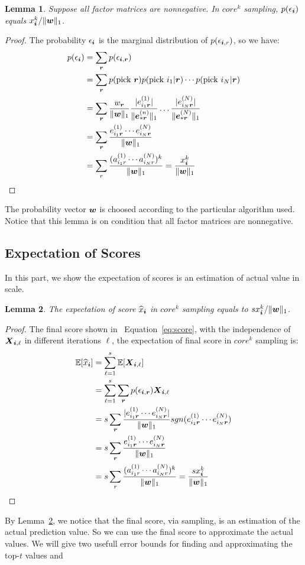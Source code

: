 \documentclass[letterpaper]{article}
\newcommand{\Sca}[3]{{#1}^{(#2)}_{i_#2#3}}%
\newcommand{\anr}[2]{\Sca{a}{#1}{#2}}
\newcommand{\enr}[2]{\Sca{e}{#1}{\V{#2}}}
\newcommand{\score}[1]{\M{X}_{\V{i},#1}}
\newcommand{\V}[1]{{\bm{{\MakeLowercase{#1}}}}}
\newcommand{\VnC}[3]{\V{#1}^{(#2)}_{#3}}
\newcommand{\M}[1]{{\bm{{\MakeUppercase{#1}}}}}
\newcommand{\norm}[2]{\|#1\|_{#2}}
\newcommand{\Eqn}[1]   {Equation~\ref{eq:#1}}
\newcommand{\Lem}[1]  {Lemma~\ref{lem:#1}}
\newcommand{\predx}{\widehat{x}_{\V{i}}}
\newtheorem{lemma}{Lemma}
\begin{document}
\begin{lemma}\label{lem:Probability}
    Suppose all factor matrices are nonnegative.
    In $core^k$ sampling, $p(\epsilon_{\V{i}})$ equals $x^k_{\V{i}}/\norm{\V{w}}{1}$.
\end{lemma}
\begin{proof}
The probability $\epsilon_{\V{i}}$ is the marginal distribution of $p(\epsilon_{\V{i},r})$,
so we have:
\begin{align*}
p(\epsilon_{\V{i}})
& = \sum_{\V{r}} p(\epsilon_{\V{i},\V{r}}) \\
& = \sum_{\V{r}} p({\rm pick\ }\V{r})p({\rm pick\ }i_1|\V{r})\cdots p({\rm pick\ }i_N|\V{r})\\
& = \sum_{\V{r}} \frac{w_{\V{r}}}{\norm{\V{W}}{1}}
    \frac{|\Sca{e}{1}{\V{r}}|}{\norm{\VnC{e}{n}{*\V{r}}}{1}}\ldots\frac{|\Sca{e}{N}{\V{r}}|}{\norm{\VnC{e}{N}{*\V{r}}}{1}}\\
& = \sum_{\V{r}} \frac{\Sca{e}{1}{\V{r}}\cdots\Sca{e}{N}{\V{r}}}{\norm{\V{W}}{1}}\\
& = \sum_{r}\frac{(\anr{1}{r}\cdots\anr{N}{r})^k}{\norm{\V{W}}{1}}
  = \frac{x^k_{\V{i}}}{\norm{\V{w}}{1}}
\end{align*}
\end{proof}
The probability vector $\V{w}$ is choosed according to the particular algorithm used.
Notice that this lemma is on condition that all factor matrices are nonnegative.
\subsection{Expectation of Scores}
In this part, we show the expectation of scores is an estimation of actual value in scale.
\begin{lemma}\label{lem:Expectation}
The expectation of score $\widehat{x}_{\V{i}}$ in $core^k$ sampling equals to $sx^k_{\V{i}}/\norm{\V{w}}{1}$.
\end{lemma}
\begin{proof}
    The final score shown in ~\Eqn{score},
    with the independence of $\score{\ell}$ in different iterations $\ell$,
    the expectation of final score in  $core^k$ sampling is:
\begin{align*}
\mathbb{E}[\predx]
& = \sum_{\ell=1}^{s}\mathbb{E}[\score{\ell}]\\
& = \sum_{\ell=1}^{s}\sum_{\V{r}} p(\epsilon_{\V{i},\V{r}})\score{\ell} \\
& = s\sum_{\V{r}} \frac{|\enr{1}{r}\cdots\enr{N}{r}|}{\norm{\V{W}}{1}}
                  sgn(\enr{1}{r}\cdots\enr{N}{r})\\
& = s\sum_{\V{r}} \frac{\enr{1}{r}\cdots\enr{N}{r}}{\norm{\V{W}}{1}}\\
& = s\sum_{r}\frac{(\anr{1}{r}\cdots\anr{N}{r})^k}{\norm{\V{W}}{1}}
= \frac{sx^k_{\V{i}}}{\norm{\V{w}}{1}}
\end{align*}
\end{proof}
By \Lem{Expectation}, we notice that the final score, via sampling,
is an estimation of the actual prediction value.
So we can use the final score to approximate the actual values.
We will give two usefull error bounds for finding and approximating the top-$t$ values and 
\end{document}
